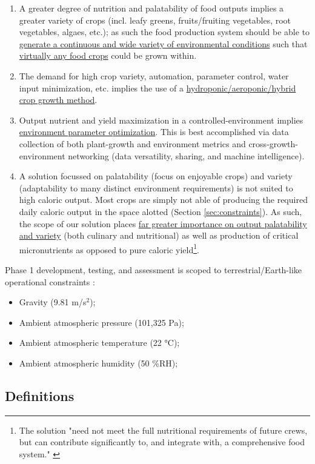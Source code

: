 \documentclass{report}
\begin{document}
\begin{enumerate}[label=SC\arabic*., ref=SC\arabic*]
\newpage
\item \label{sc:5} A greater degree of nutrition and palatability of food outputs implies a greater variety of crops (incl. leafy greens, fruits/fruiting vegetables, root vegetables, algaes, etc.); as such the food production system should be able to \uline{generate a continuous and wide variety of environmental conditions} such that \uline{virtually any food crops} could be grown within.
\item \label{sc:6} The demand for high crop variety, automation, parameter control, water input minimization, etc. implies the use of a \uline{hydroponic/aeroponic/hybrid crop growth method}.
\item \label{sc:7} Output nutrient and yield maximization in a controlled-environment implies \uline{environment parameter optimization}. 
    This is best accomplished via data collection of both plant-growth and environment metrics and cross-growth-environment networking (data versatility, sharing, and machine intelligence).
\item \label{sc:8} A solution focussed on palatability (focus on enjoyable crops) and variety (adaptability to many distinct environment requirements) is not suited to high caloric output. 
    Most crops are simply not able of producing the required daily caloric output in the space alotted (Section \ref{sec:constraints}). 
    As such, the scope of our solution places \uline{far greater importance on output palatability and variety} (both culinary and nutritional) as well as production of critical micronutrients as opposed to pure caloric 
    yield\footnote{The solution "need not meet the full nutritional requirements of future crews, but can contribute significantly to, and integrate with, a comprehensive food system." \cite{applicantguide}}.
\end{enumerate}
Phase 1 development, testing, and assessment is scoped to terrestrial/Earth-like operational constraints \cite{applicantguide}:
\begin{itemize}
    \item Gravity (9.81 m/s${}^2$);
    \item Ambient atmospheric pressure (101,325 Pa);
    \item Ambient atmospheric temperature (22 °C);
    \item Ambient atmospheric humidity (50 \%RH);
\end{itemize}

\newpage
\subsection{Definitions}
\label{sec:definitions}
\end{document}
